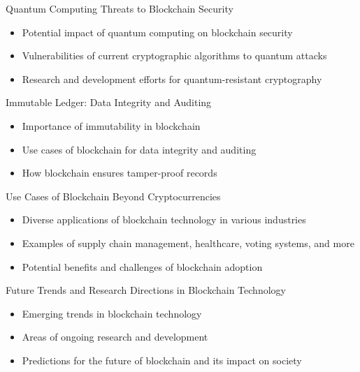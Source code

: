 \begin{withoutheadline}
\begin{frame}{Quantum Computing Threats to Blockchain Security}
    \begin{itemize}
        \item Potential impact of quantum computing on blockchain security
        \item Vulnerabilities of current cryptographic algorithms to quantum attacks
        \item Research and development efforts for quantum-resistant cryptography
    \end{itemize}
\end{frame}

\begin{frame}{Immutable Ledger: Data Integrity and Auditing}
    \begin{itemize}
        \item Importance of immutability in blockchain
        \item Use cases of blockchain for data integrity and auditing
        \item How blockchain ensures tamper-proof records
    \end{itemize}
\end{frame}

\begin{frame}{Use Cases of Blockchain Beyond Cryptocurrencies}
    \begin{itemize}
        \item Diverse applications of blockchain technology in various industries
        \item Examples of supply chain management, healthcare, voting systems, and more
        \item Potential benefits and challenges of blockchain adoption
    \end{itemize}
\end{frame}

\begin{frame}{Future Trends and Research Directions in Blockchain Technology}
    \begin{itemize}
        \item Emerging trends in blockchain technology
        \item Areas of ongoing research and development
        \item Predictions for the future of blockchain and its impact on society
    \end{itemize}
\end{frame}


\end{withoutheadline}
